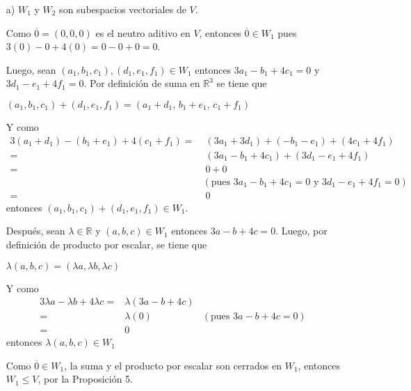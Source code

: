 \documentclass[fleqn]{article}
\begin{document}
\begin{enumerate}
        \begin{enumerate}
            \item[a)] $ W_1 $ y $ W_2 $ son subespacios vectoriales de $ V $. \par
            Como $ \overline{0} = (0,0,0) $ es el neutro aditivo en $ V $, entonces $ \overline{0} \in W_1 $ pues $ 3(0) - 0 + 4(0) = 0 - 0 + 0 = 0 $. \par

            Luego, sean $ (a_1,b_1,c_1), (d_1,e_1,f_1) \in W_1 $ entonces $ 3a_1 - b_1 + 4c_1 = 0 $ y $ 3d_1 - e_1 + 4f_1 = 0 $. Por definición de suma en $ \mathbb{R}^3 $ se tiene que \par

            $ (a_1,b_1,c_1) + (d_1,e_1,f_1) = (a_1+d_1, \, b_1+e_1, \, c_1+f_1) $ \par

            Y como
            \begin{align*}
                3(a_1+d_1) - (b_1+e_1) + 4(c_1+f_1) =& \; (3a_1 + 3d_1) + (- b_1 - e_1) + (4c_1 + 4f_1) \\
                =& \; (3a_1 - b_1 + 4c_1) + (3d_1 - e_1 + 4f_1) \\
                =& \; 0 + 0 \\
                & (\text{pues } 3a_1 - b_1 + 4c_1 = 0 \text{ y } 3d_1 - e_1 + 4f_1 = 0) \\
                =& \; 0
            \end{align*}
            entonces $ (a_1,b_1,c_1) + (d_1,e_1,f_1) \in W_1 $.

            Después, sean $ \lambda \in \mathbb{R} $ y $ (a,b,c) \in W_1 $ entonces $ 3a - b + 4c = 0 $. Luego, por definición de producto por escalar, se tiene que \par

            $ \lambda (a,b,c) = (\lambda a, \lambda b, \lambda c) $ \par

            Y como
            \begin{align*}
                3\lambda a - \lambda b + 4 \lambda c =& \lambda (3a - b + 4c) \\
                =& \lambda (0) &(\text{pues } 3a - b + 4c = 0) \\
                =& 0
            \end{align*}
            entonces $ \lambda (a,b,c) \in W_1 $ \par

            Como $ \overline{0} \in W_1 $, la suma y el producto por escalar son cerrados en $ W_1 $, entonces $ W_1 \leq V $, por la Proposición 5.
            

\end{enumerate}
\end{enumerate}
\end{document}
